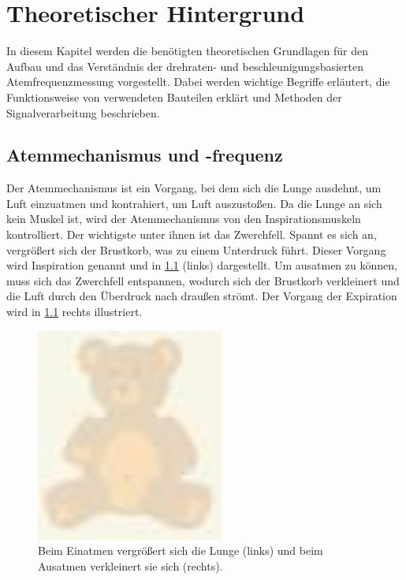 
\lhead[\chaptername~\thechapter]{\rightmark}


\rhead[\leftmark]{}


\lfoot[\thepage]{}


\cfoot{}


\rfoot[]{\thepage}


\chapter{Theoretischer Hintergrund}
In diesem Kapitel werden die benötigten theoretischen Grundlagen für den Aufbau und das Verständnis der drehraten- und beschleunigungsbasierten Atemfrequenzmessung vorgestellt. Dabei werden wichtige Begriffe erläutert, die Funktionsweise von verwendeten Bauteilen erklärt und Methoden der Signalverarbeitung beschrieben.

\section{Atemmechanismus und -frequenz}
Der Atemmechanismus ist ein Vorgang, bei dem sich die Lunge ausdehnt, um Luft einzuatmen und kontrahiert, um Luft auszustoßen. Da die Lunge an sich kein Muskel ist, wird der Atemmechanismus von den Inspirationsmuskeln kontrolliert. Der wichtigste unter ihnen ist das Zwerchfell. Spannt es sich an, vergrößert sich der Brustkorb, was zu einem Unterdruck führt. Dieser Vorgang wird Inspiration genannt und in \ref{img:atemmechanik} (links) dargestellt. Um ausatmen zu können, muss sich das Zwerchfell entspannen, wodurch sich der Brustkorb verkleinert und die Luft durch den Überdruck nach draußen strömt. Der Vorgang der Expiration wird in \ref{img:atemmechanik} rechts illustriert\cite{anatomy-and-physiology}. 

\begin{figure}[h]
	\centering
	\includegraphics[width=0.55\textwidth]{images/atemmechanik.pdf}
	\caption[Atemmechanik]{Beim Einatmen vergrößert sich die Lunge (links) und beim Ausatmen verkleinert sie sich (rechts).}
	\label{img:atemmechanik}
\end{figure}

